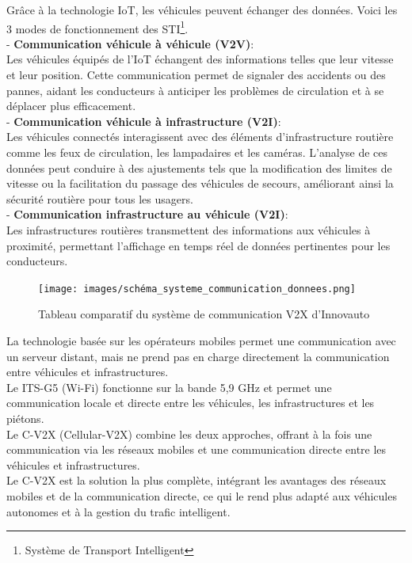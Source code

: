 Grâce à la technologie IoT, les véhicules peuvent échanger des données. Voici les 3 modes de fonctionnement des STI\footnote{Système de Transport Intelligent}.\\
- \textbf{Communication véhicule à véhicule (V2V)}:\\
Les véhicules équipés de l’IoT échangent des informations telles que leur vitesse et leur position. Cette communication permet de signaler des accidents ou des pannes, aidant les conducteurs à anticiper les problèmes de circulation et à se déplacer plus efficacement.\\
- \textbf{Communication véhicule à infrastructure (V2I)}:\\
Les véhicules connectés interagissent avec des éléments d’infrastructure routière comme les feux de circulation, les lampadaires et les caméras. 
L’analyse de ces données peut conduire à des ajustements tels que la modification des limites de vitesse ou la facilitation du passage des véhicules de secours, améliorant ainsi la sécurité routière pour tous les usagers.\\
- \textbf{Communication infrastructure au véhicule (V2I)}:\\
Les infrastructures routières transmettent des informations aux véhicules à proximité, permettant l’affichage en temps réel de données pertinentes pour les conducteurs.

\begin{figure}[h]
    \centering
    \texttt{[image: images/schéma\_systeme\_communication\_donnees.png]} 
    \caption{Tableau comparatif du système de communication V2X d'Innovauto}
\end{figure}

La technologie basée sur les opérateurs mobiles permet une communication avec un serveur distant, mais ne prend pas en charge directement la communication entre véhicules et infrastructures.\\
Le ITS-G5 (Wi-Fi) fonctionne sur la bande 5,9 GHz et permet une communication locale et directe entre les véhicules, les infrastructures et les piétons.\\
Le C-V2X (Cellular-V2X) combine les deux approches, offrant à la fois une communication via les réseaux mobiles et une communication directe entre les véhicules et infrastructures.\\
Le C-V2X est la solution la plus complète, intégrant les avantages des réseaux mobiles et de la communication directe, ce qui le rend plus adapté aux véhicules autonomes et à la gestion du trafic intelligent.

